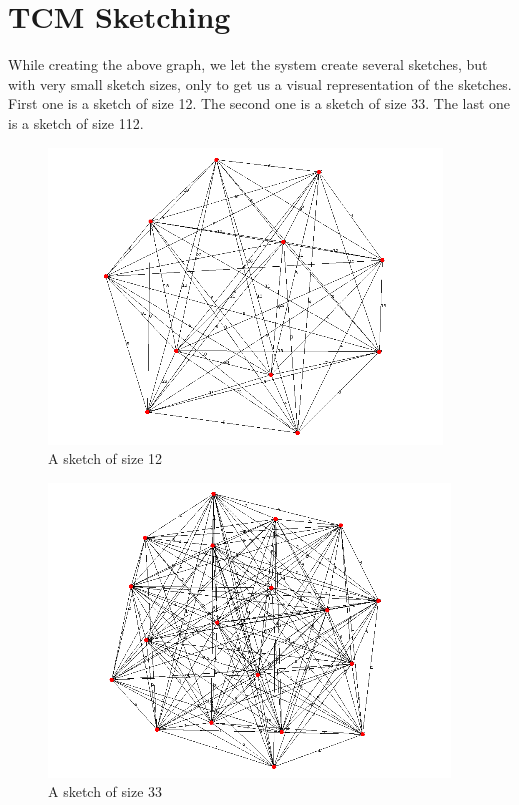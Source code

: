 \documentclass[12pt]{report}
\numberwithin{figure}{section}
\numberwithin{table}{section}
\begin{document}
\section{TCM Sketching}
While creating the above graph, we let the system create several sketches, but with very small sketch sizes, only to get us a visual representation of the sketches. First one is a sketch of size 12. The second one is a sketch of size 33. The last one is a sketch of size 112.


\begin{figure}[H]
\centering
\includegraphics[scale=0.8]{images/s1}
\caption{A sketch of size 12}
\end{figure}



\begin{figure}[H]
\centering
\includegraphics[scale=0.8]{images/s2}
\caption{A sketch of size 33}
\end{figure}

 
\end{document}
